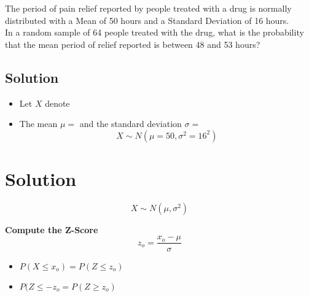

\large  \noindent	The period of pain relief reported by people treated with a drug is normally distributed with a Mean of 50 hours and a Standard Deviation of 16 hours.  \\
\medskip
\noindent  In a random sample of 64 people treated with the drug, what is the probability that the mean period of relief reported is between 48 and 53 hours?

\subsection*{Solution}

\begin{itemize}
    \item Let $X$ denote
    \item The mean $\mu = $ and the standard deviation $\sigma = $
\[  X \sim N(\mu = 50, \sigma^2 = 16^2) \]
\end{itemize}


\section*{Solution}
\[X \sim N(\mu,\sigma^2) \]
\begin{framed}
\noindent \textbf{Compute the Z-Score}
\[ z_{o} = \frac{ x_{o} - \mu}{\sigma} \]
\end{framed}
\begin{itemize}
    \item $P(X\leq x_{o}) = P(Z \leq z_{o})$
    \item $P(Z \leq -z_{o} = P(Z \geq z_{o})$
\end{itemize}


